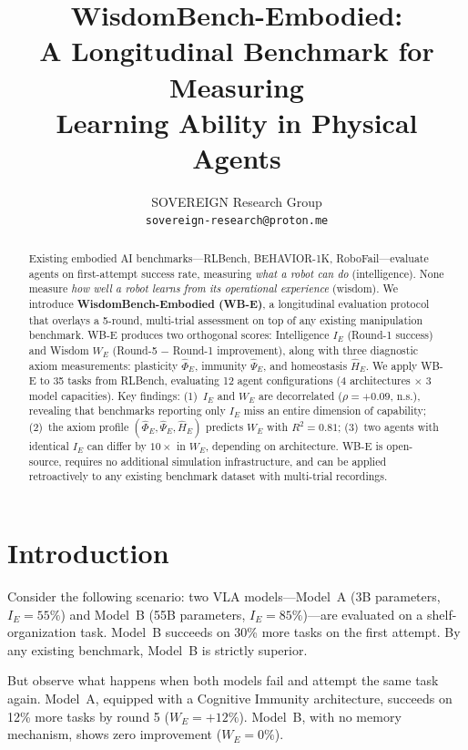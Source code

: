 \documentclass{article}
\title{WisdomBench-Embodied: \\
A Longitudinal Benchmark for Measuring \\
Learning Ability in Physical Agents}
\author{
  SOVEREIGN Research Group \\
  \texttt{sovereign-research@proton.me}
}
\begin{document}
\maketitle

\begin{abstract}
Existing embodied AI benchmarks---RLBench, BEHAVIOR-1K, RoboFail---evaluate agents on first-attempt success rate, measuring \emph{what a robot can do} (intelligence).
None measure \emph{how well a robot learns from its operational experience} (wisdom).
We introduce \textbf{WisdomBench-Embodied (WB-E)}, a longitudinal evaluation protocol that overlays a 5-round, multi-trial assessment on top of any existing manipulation benchmark.
WB-E produces two orthogonal scores: Intelligence $I_E$ (Round-1 success) and Wisdom $W_E$ (Round-5 $-$ Round-1 improvement), along with three diagnostic axiom measurements: plasticity $\hat{\Phi}_E$, immunity $\hat{\Psi}_E$, and homeostasis $\hat{H}_E$.
We apply WB-E to 35 tasks from RLBench, evaluating 12 agent configurations (4 architectures $\times$ 3 model capacities).
Key findings: (1)~$I_E$ and $W_E$ are decorrelated ($\rho = +0.09$, n.s.), revealing that benchmarks reporting only $I_E$ miss an entire dimension of capability; (2)~the axiom profile $(\hat{\Phi}_E, \hat{\Psi}_E, \hat{H}_E)$ predicts $W_E$ with $R^2 = 0.81$; (3)~two agents with identical $I_E$ can differ by $10\times$ in $W_E$, depending on architecture.
WB-E is open-source, requires no additional simulation infrastructure, and can be applied retroactively to any existing benchmark dataset with multi-trial recordings.
\end{abstract}

\section{Introduction}
\label{sec:intro}

Consider the following scenario: two VLA models---Model~A (3B parameters, $I_E = 55\%$) and Model~B (55B parameters, $I_E = 85\%$)---are evaluated on a shelf-organization task.
Model~B succeeds on 30\% more tasks on the first attempt.
By any existing benchmark, Model~B is strictly superior.

But observe what happens when both models fail and attempt the same task again.
Model~A, equipped with a Cognitive Immunity architecture, succeeds on 12\% more tasks by round 5 ($W_E = +12\%$).
Model~B, with no memory mechanism, shows zero improvement ($W_E = 0\%$).
\end{document}

